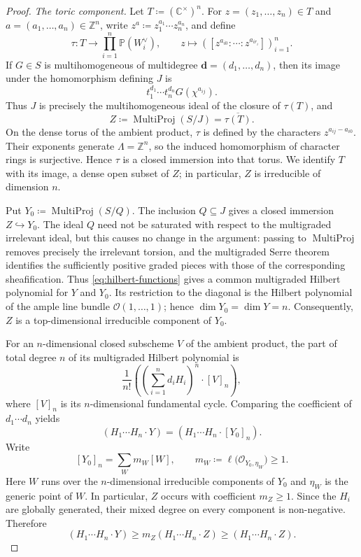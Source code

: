 \documentclass[11pt,a4paper]{amsart}
\newcommand{\MultiProj}{\operatorname{MultiProj}}
\begin{document}
\begin{proof}
\smallskip
\noindent\emph{The toric component.}
Let $T\coloneqq(\mathbb C^\times)^n$.  For
$z=(z_1,\ldots,z_n)\in T$ and
$a=(a_1,\ldots,a_n)\in\mathbb Z^n$, write
$z^a\coloneqq z_1^{a_1}\cdots z_n^{a_n}$, and define
\[
 \tau\colon T\longrightarrow\prod_{i=1}^n\mathbb P(W_i^\vee),\qquad
 z\longmapsto
 \left([z^{a_{i0}}:\cdots:z^{a_{ir_i}}]\right)_{i=1}^n.
\]
If $G\in S$ is multihomogeneous of multidegree
$\mathbf d=(d_1,\ldots,d_n)$, then its image under the homomorphism defining
$J$ is
\[
 t_1^{d_1}\cdots t_n^{d_n}G(\chi^{a_{ij}}).
\]
Thus $J$ is precisely the multihomogeneous ideal of the closure of
$\tau(T)$, and
\[
 Z\coloneqq\MultiProj(S/J)=\overline{\tau(T)}.
\]
On the dense torus of the ambient product, $\tau$ is defined by the
characters $z^{a_{ij}-a_{i0}}$.  Their exponents generate
$\Lambda=\mathbb Z^n$, so the induced homomorphism of character rings is
surjective.  Hence $\tau$ is a closed immersion into that torus.  We identify
$T$ with its image, a dense open subset of $Z$; in particular, $Z$ is
irreducible of dimension $n$.

Put $Y_0\coloneqq\MultiProj(S/Q)$.  The inclusion $Q\subseteq J$ gives a
closed immersion $Z\hookrightarrow Y_0$.  The ideal $Q$ need not be
saturated with respect to the multigraded irrelevant ideal, but this causes
no change in the argument: passing to $\MultiProj$ removes precisely the
irrelevant torsion, and the multigraded Serre theorem identifies the
sufficiently positive graded pieces with those of the corresponding
sheafification.  Thus \eqref{eq:hilbert-functions} gives a common
multigraded Hilbert polynomial for $Y$ and $Y_0$.  Its restriction to the
diagonal is the Hilbert polynomial of the ample line bundle
$\mathcal O(1,\ldots,1)$; hence
$\dim Y_0=\dim Y=n$.  Consequently, $Z$ is a top-dimensional irreducible
component of $Y_0$.

For an $n$-dimensional closed subscheme $V$ of the ambient product, the part
of total degree $n$ of its multigraded Hilbert polynomial is
\[
 \frac{1}{n!}
 \left(\left(\sum_{i=1}^n d_iH_i\right)^n\cdot[V]_n\right),
\]
where $[V]_n$ is its $n$-dimensional fundamental cycle.  Comparing the
coefficient of $d_1\cdots d_n$ yields
\[
 (H_1\cdots H_n\cdot Y)
 =(H_1\cdots H_n\cdot[Y_0]_n).
\]
Write
\[
 [Y_0]_n=\sum_Wm_W[W],\qquad
 m_W\coloneqq\ell\bigl(\mathcal O_{Y_0,\eta_W}\bigr)\geq1.
\]
Here $W$ runs over the $n$-dimensional irreducible components of $Y_0$ and
$\eta_W$ is the generic point of $W$.  In particular, $Z$ occurs with
coefficient $m_Z\geq1$.
Since the $H_i$ are globally generated, their mixed degree on every
component is non-negative.  Therefore
\begin{equation}\label{eq:component-degree}
 (H_1\cdots H_n\cdot Y)
 \geq m_Z(H_1\cdots H_n\cdot Z)
 \geq(H_1\cdots H_n\cdot Z).
\end{equation}


\end{proof}
\end{document}
